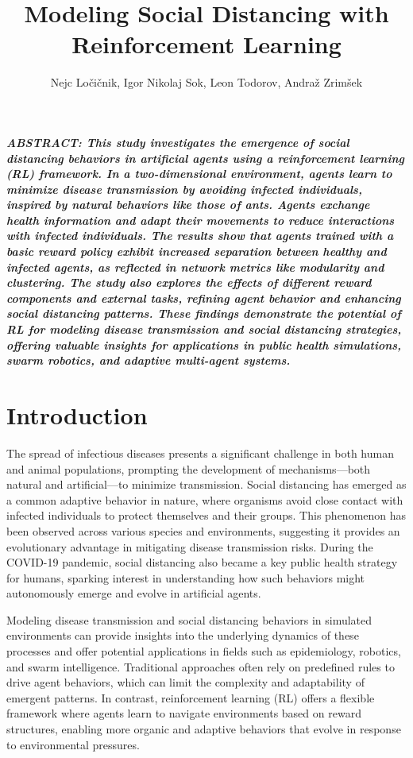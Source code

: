 \documentclass[9pt]{IEEEtran}
\title{\vspace{0ex}
Modeling Social Distancing with Reinforcement Learning}
\author{Nejc Ločičnik, Igor Nikolaj Sok, Leon Todorov, Andraž Zrimšek \vspace{-4.0ex}}
\begin{document}
\maketitle

\noindent\textit{\textbf{ABSTRACT: This study investigates the emergence of social distancing behaviors in artificial agents using a reinforcement learning (RL) framework. In a two-dimensional environment, agents learn to minimize disease transmission by avoiding infected individuals, inspired by natural behaviors like those of ants. Agents exchange health information and adapt their movements to reduce interactions with infected individuals. The results show that agents trained with a basic reward policy exhibit increased separation between healthy and infected agents, as reflected in network metrics like modularity and clustering. The study also explores the effects of different reward components and external tasks, refining agent behavior and enhancing social distancing patterns. These findings demonstrate the potential of RL for modeling disease transmission and social distancing strategies, offering valuable insights for applications in public health simulations, swarm robotics, and adaptive multi-agent systems.}}

\section{Introduction}

The spread of infectious diseases presents a significant challenge in both human and animal populations, prompting the development of mechanisms—both natural and artificial—to minimize transmission. Social distancing has emerged as a common adaptive behavior in nature, where organisms avoid close contact with infected individuals to protect themselves and their groups. This phenomenon has been observed across various species and environments, suggesting it provides an evolutionary advantage in mitigating disease transmission risks. During the COVID-19 pandemic, social distancing also became a key public health strategy for humans, sparking interest in understanding how such behaviors might autonomously emerge and evolve in artificial agents.

Modeling disease transmission and social distancing behaviors in simulated environments can provide insights into the underlying dynamics of these processes and offer potential applications in fields such as epidemiology, robotics, and swarm intelligence. Traditional approaches often rely on predefined rules to drive agent behaviors, which can limit the complexity and adaptability of emergent patterns. In contrast, reinforcement learning (RL) offers a flexible framework where agents learn to navigate environments based on reward structures, enabling more organic and adaptive behaviors that evolve in response to environmental pressures.
\end{document}

